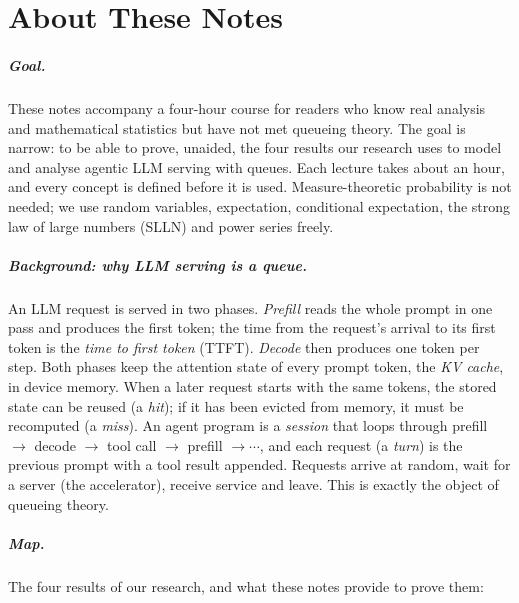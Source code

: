\chapter*{About These Notes}

\paragraph{Goal.} These notes accompany a four-hour course for readers who
know real analysis and mathematical statistics but have not met queueing
theory. The goal is narrow: to be able to prove, unaided, the four results
our research uses to model and analyse agentic LLM serving with queues.
Each lecture takes about an hour, and every concept is defined before it is
used. Measure-theoretic probability is not needed; we use random variables,
expectation, conditional expectation, the strong law of large numbers
(SLLN) and power series freely.

\paragraph{Background: why LLM serving is a queue.} An LLM request is
served in two phases. \emph{Prefill} reads the whole prompt in one pass and
produces the first token; the time from the request's arrival to its first
token is the \emph{time to first token} (TTFT). \emph{Decode} then produces
one token per step. Both phases keep the attention state of every prompt
token, the \emph{KV cache}, in device memory. When a later request starts
with the same tokens, the stored state can be reused (a \emph{hit}); if it
has been evicted from memory, it must be recomputed (a \emph{miss}). An
agent program is a \emph{session} that loops through
prefill $\to$ decode $\to$ tool call $\to$ prefill $\to\cdots$, and each
request (a \emph{turn}) is the previous prompt with a tool result appended.
Requests arrive at random, wait for a server (the accelerator), receive
service and leave. This is exactly the object of queueing theory.

\paragraph{Map.} The four results of our research, and what these notes
provide to prove them:

